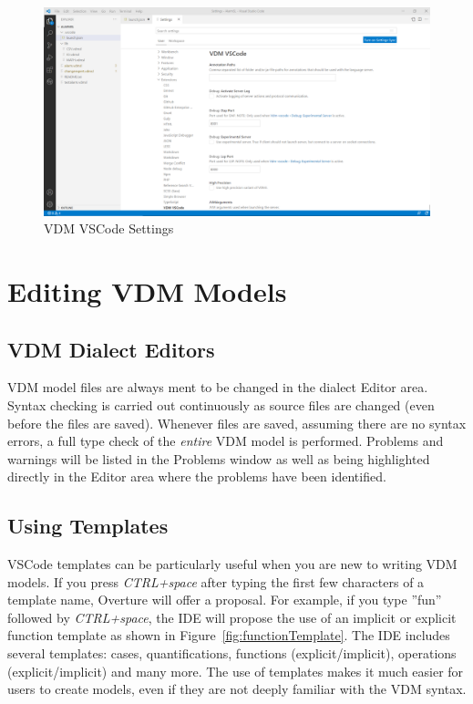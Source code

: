 \documentclass{overturerepchap}
\begin{document}
\begin{figure}[!hbt]
\begin{center}
  \includegraphics[width=\textwidth]{snapshots/Settings VDM VSCode.PNG}
  \caption[Overture Project Settings]{VDM VSCode Settings}
  \label{fig:VDMSettings}
\end{center}
\end{figure}





\chapter{Editing VDM Models}\label{sec:editVDM}

\section{VDM Dialect Editors}

VDM model files are always ment to be changed in the dialect Editor area. Syntax checking
is carried out continuously as source files are
changed (even before the files are saved). Whenever files are saved, assuming
there are no syntax errors, a full type check of the \emph{entire} VDM model is
performed.
Problems and warnings will be listed in the Problems window as well as
being highlighted directly in the Editor area where the problems have been
identified.


\section{Using Templates}\label{sec:templates}

VSCode templates can be particularly useful when you are new to
writing VDM models. If you press \textit{CTRL+space} after typing the
first few characters of a template name, Overture will offer a
proposal. For example, if you type ''fun'' followed by
\textit{CTRL+space}, the IDE will propose the use of an implicit or
explicit function template as shown in
Figure~\ref{fig:functionTemplate}. The IDE includes several templates:
cases, quantifications, functions (explicit/implicit), operations
(explicit/implicit) and many more. The use of templates makes it much
easier for users to create models, even if they are not deeply
familiar with the VDM syntax.
\end{document}
